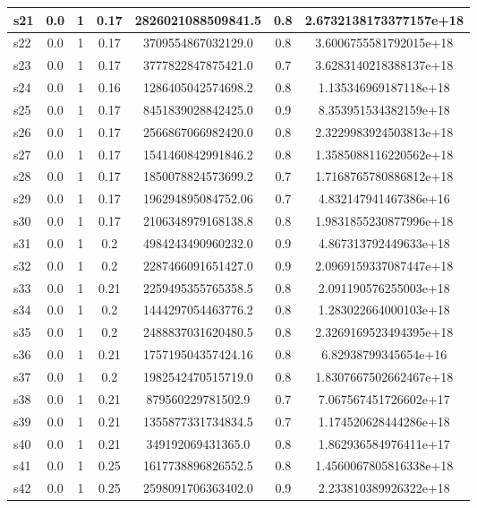 \documentclass{article}
\begin{document}
\begin{tabular}{|l|c|c|c|c|c|c|}
\hline
s21 &0.0 & 1 & 0.17 & 2826021088509841.5 & 0.8 & 2.6732138173377157e+18\\
\hline
s22 &0.0 & 1 & 0.17 & 3709554867032129.0 & 0.8 & 3.6006755581792015e+18\\
\hline
s23 &0.0 & 1 & 0.17 & 3777822847875421.0 & 0.7 & 3.6283140218388137e+18\\
\hline
s24 &0.0 & 1 & 0.16 & 1286405042574698.2 & 0.8 & 1.135346969187118e+18\\
\hline
s25 &0.0 & 1 & 0.17 & 8451839028842425.0 & 0.9 & 8.353951534382159e+18\\
\hline
s26 &0.0 & 1 & 0.17 & 2566867066982420.0 & 0.8 & 2.3229983924503813e+18\\
\hline
s27 &0.0 & 1 & 0.17 & 1541460842991846.2 & 0.8 & 1.3585088116220562e+18\\
\hline
s28 &0.0 & 1 & 0.17 & 1850078824573699.2 & 0.7 & 1.7168765780886812e+18\\
\hline
s29 &0.0 & 1 & 0.17 & 196294895084752.06 & 0.7 & 4.832147941467386e+16\\
\hline
s30 &0.0 & 1 & 0.17 & 2106348979168138.8 & 0.8 & 1.9831855230877996e+18\\
\hline
s31 &0.0 & 1 & 0.2 & 4984243490960232.0 & 0.9 & 4.867313792449633e+18\\
\hline
s32 &0.0 & 1 & 0.2 & 2287466091651427.0 & 0.9 & 2.0969159337087447e+18\\
\hline
s33 &0.0 & 1 & 0.21 & 2259495355765358.5 & 0.8 & 2.091190576255003e+18\\
\hline
s34 &0.0 & 1 & 0.2 & 1444297054463776.2 & 0.8 & 1.283022664000103e+18\\
\hline
s35 &0.0 & 1 & 0.2 & 2488837031620480.5 & 0.8 & 2.3269169523494395e+18\\
\hline
s36 &0.0 & 1 & 0.21 & 175719504357424.16 & 0.8 & 6.82938799345654e+16\\
\hline
s37 &0.0 & 1 & 0.2 & 1982542470515719.0 & 0.8 & 1.8307667502662467e+18\\
\hline
s38 &0.0 & 1 & 0.21 & 879560229781502.9 & 0.7 & 7.067567451726602e+17\\
\hline
s39 &0.0 & 1 & 0.21 & 1355877331734834.5 & 0.7 & 1.174520628444286e+18\\
\hline
s40 &0.0 & 1 & 0.21 & 349192069431365.0 & 0.8 & 1.862936584976411e+17\\
\hline
s41 &0.0 & 1 & 0.25 & 1617738896826552.5 & 0.8 & 1.4560067805816338e+18\\
\hline
s42 &0.0 & 1 & 0.25 & 2598091706363402.0 & 0.9 & 2.233810389926322e+18\\

\end{tabular}
\end{document}
